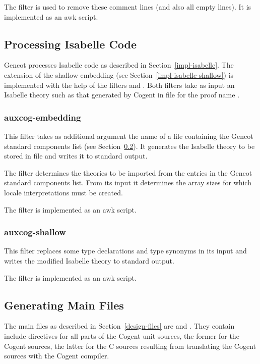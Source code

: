 The filter  is used to remove these comment lines (and also all empty lines). It is implemented
as an awk script.

\subsection{Processing Isabelle Code}
\label{impl-ocomps-isabelle}

Gencot processes Isabelle code as described in Section~\ref{impl-isabelle}. The extension of the shallow embedding
(see Section~\ref{impl-isabelle-shallow}) is implemented with the help of the filters  and
. Both filters take as input an Isabelle theory such as that generated by Cogent in file
 for the proof name .

\subsubsection{auxcog-embedding}

This filter takes as additional argument the name of a file containing the Gencot standard components list (see 
Section~\ref{impl-ocomps-main}). It generates the Isabelle theory to be stored in file 
and writes it to standard output.

The filter determines the theories to be imported from the entries  in the Gencot standard
components list. From its input it determines the array sizes for which locale interpretations must be created.

The filter is implemented as an awk script.

\subsubsection{auxcog-shallow}

This filter replaces some type declarations and type synonyms in its input and writes the modified Isabelle theory
to standard output.

The filter is implemented as an awk script.

\subsection{Generating Main Files}
\label{impl-ocomps-main}

The main files as described in Section~\ref{design-files} are  and . They
contain include directives for all parts of the Cogent unit sources, the former for the Cogent sources, the latter 
for the C sources resulting from translating the Cogent sources with the Cogent compiler.

